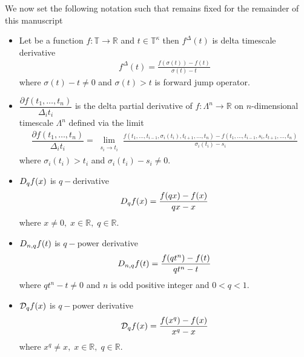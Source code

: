 We now set the following notation such that remains fixed for the remainder of this manuscript
\begin{itemize}
    \setlength\itemsep{1.6em}
    \item Let be a function $f\colon \mathbb{T} \to \mathbb{R}$ and $t\in\mathbb{T}^{\kappa}$ then $f^{\Delta}(t)$
    is delta timescale derivative~\cite{Bohner2001DynamicEO}
    \begin{align*}
        f^{\Delta} (t) = \frac{f(\sigma(t)) - f(t)}{\sigma(t) - t}
    \end{align*}
    where $\sigma(t) - t \neq 0$ and $\sigma(t) > t$ is forward jump operator.

    \item $\dfrac{\partial f(t_1,\ldots,t_n)}{\Delta_i t_i}$ is the delta partial derivative
    of $f\colon \Lambda^n \to \mathbb{R}$ on $n$-dimensional timescale
    $\Lambda^n$ defined via the limit~\cite{bohner2004partial, ahlbrandt2002partial,JACKSON2006391}
    \begin{align*}
        \dfrac{\partial f(t_1,\ldots,t_n)}{\Delta_i t_i} = \lim \limits_{\substack{s_i \to t_i}}
        \frac{
            f(t_1, \ldots, t_{i-1}, \sigma_i(t_i), t_{t+1}, \ldots, t_n)
            - f(t_1, \ldots, t_{i-1}, s_i, t_{t+1}, \ldots, t_n)
        }{\sigma_i(t_i) - s_i}
    \end{align*}
    where $\sigma_i(t_i) > t_i$ and $\sigma_i(t_i) - s_i \neq 0$.

    \item $D_{q} f(x)$ is $q-$derivative~\cite{jackson_1909,ernst2000history,ernst2008different,kac2001quantum}
    \begin{align*}
        D_{q} f(x) = \frac{f(qx)-f(x)}{qx-x}
    \end{align*}
    where $x\neq 0, \; x\in\mathbb{R}, \; q\in\mathbb{R}$.

    \item $D_{n,q} f(t)$ is $q-$power derivative~\cite{aldwoah2011power}
    \begin{align*}
        D_{n,q} f(t) = \frac{f(qt^n) - f(t)}{qt^n - t}
    \end{align*}
    where $qt^n - t \neq 0$ and $n$ is odd positive integer and $0 < q < 1$.

    \item $\mathcal{D}_q f(x)$ is $q-$power derivative
    \begin{align*}
        \mathcal{D}_q f(x) = \frac{f(x^q)-f(x)}{x^q-x}
    \end{align*}
    where $x^q \neq x, \; x\in\mathbb{R}, \; q\in\mathbb{R}$.


\end{itemize}
